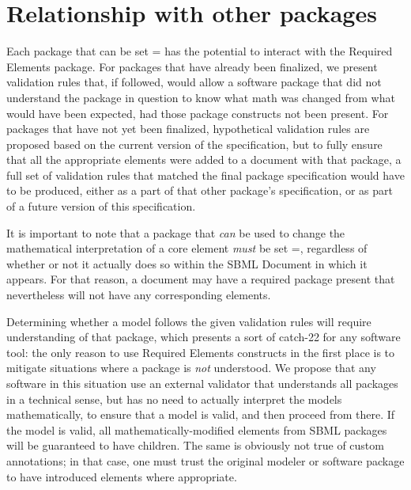 
\section{Relationship with other packages}
\label{other-packages}

Each package that can be set = has the potential to interact with the Required Elements package.  For packages that have already been finalized, we present validation rules that, if followed, would allow a software package that did not understand the package in question to know what math was changed from what would have been expected, had those package constructs not been present.  For packages that have not yet been finalized, hypothetical validation rules are proposed based on the current version of the specification, but to fully ensure that all the appropriate \ChangedMath elements were added to a document with that package, a full set of validation rules that matched the final package specification would have to be produced, either as a part of that other package's specification, or as part of a future version of this specification.

It is important to note that a package that \emph{can} be used to change the mathematical interpretation of a core element \emph{must} be set =, regardless of whether or not it actually does so within the SBML Document in which it appears.  For that reason, a document may have a required package present that nevertheless will not have any corresponding \ChangedMath elements.

Determining whether a model follows the given validation rules will require understanding of that package, which presents a sort of catch-22 for any software tool:  the only reason to use Required Elements constructs in the first place is to mitigate situations where a package is \emph{not} understood.  We propose that any software in this situation use an external validator that understands all packages in a technical sense, but has no need to actually interpret the models mathematically, to ensure that a model is valid, and then proceed from there.  If the model is valid, all mathematically-modified elements from SBML packages will be guaranteed to have \ChangedMath children.  The same is obviously not true of custom annotations; in that case, one must trust the original modeler or software package to have introduced \ChangedMath elements where appropriate.

